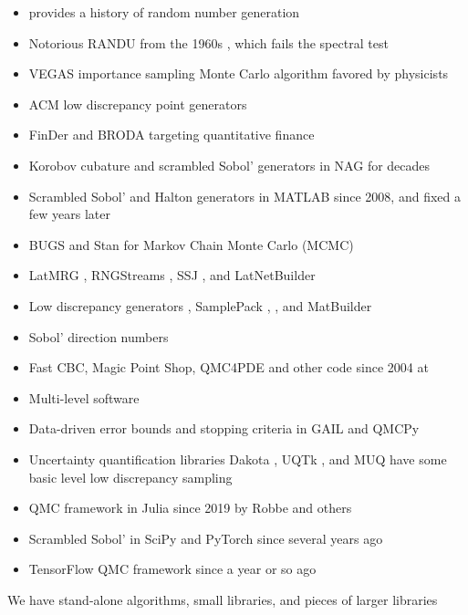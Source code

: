 \documentclass[graybox]{svmult}
\begin{document}
	\begin{itemize}
	\item \cite{LEc2017a} provides a history of random number generation
	\item Notorious RANDU from the 1960s \cite{RANDU}, which fails the spectral test
	\item VEGAS \cite{Lep78a, Lep21a} importance sampling Monte Carlo algorithm favored by physicists
	\item ACM low discrepancy point generators \cite{BraFox88,BraFoxNie92,HonHic00a}
	\item FinDer \cite{PasTra95,FinDer} and BRODA \cite{BRODA20a} targeting quantitative finance
	\item Korobov cubature and scrambled Sobol' generators in NAG \cite{NAG27} for decades		
	\item Scrambled Sobol' and Halton generators in MATLAB \cite{MAT9.13} since 2008, and fixed a few years later
	\item BUGS \cite{BUGSBook, BUGSweb} and Stan \cite{STAN} for Markov Chain Monte Carlo (MCMC)
	\item LatMRG \cite{LEcCou97}, RNGStreams \cite{LEcEtal02},  SSJ \cite{LEc2002a,SSJ}, and LatNetBuilder \cite{LatNet} 
	\item Low discrepancy generators \cite{FriKel02,FriKelweb}, SamplePack \cite{SamplePack}, \cite{GruWeb},  and MatBuilder \cite{paulin2022} 
	\item Sobol' direction numbers \cite{JoeKuo03,JoeKuo08,SobolDirection}
	\item Fast CBC, Magic Point Shop, QMC4PDE and other code since 2004  at \cite{NuyWeb} 
	\item Multi-level software \cite{GilesSoft,GilesQSoft} 
	\item Data-driven error bounds and stopping criteria in GAIL \cite{ChoEtal21a} and QMCPy \cite{QMCPy2020a, ChoEtal22a}  
	\item Uncertainty quantification libraries Dakota \cite{DakotaUsersManual}, UQTk \cite{DebEtal04,UQTk}, and MUQ \cite{MUQ}  have some basic level low discrepancy sampling
	\item QMC framework in Julia since 2019 \cite{QMCJulia} by Robbe and others 
	\item Scrambled Sobol' in SciPy \cite{virtanen2020scipy} and PyTorch \cite{paszke2019pytorch} since several years ago
	\item TensorFlow QMC framework \cite{tfqfQMC2021a} since a year or so ago
\end{itemize}

We have stand-alone algorithms, small libraries, and pieces of larger libraries



\end{document}

